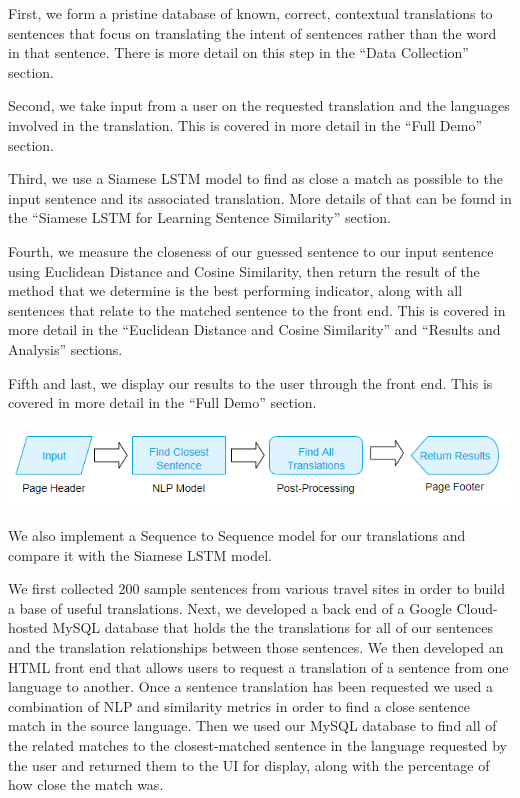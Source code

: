 \documentclass[runningheads]{llncs}
\begin{document}
	First, we form a pristine database of known, correct, contextual translations to sentences that focus on translating the intent of sentences rather than the word in that sentence. There is more detail on this step in the ``Data Collection'' section. 
	
	Second, we take input from a user on the requested translation and the languages involved in the translation. This is covered in more detail in the ``Full Demo'' section. 
	
	Third, we use a Siamese LSTM model to find as close a match as possible to the input sentence and its associated translation.  More details of that can be found in the ``Siamese LSTM for Learning Sentence Similarity'' section. 
	
	Fourth, we measure the closeness of our guessed sentence to our input sentence using Euclidean Distance and Cosine Similarity, then return the result of the method that we determine is the best performing indicator, along with all sentences that relate to the matched sentence to the front end. This is covered in more detail in the ``Euclidean Distance and Cosine Similarity'' and ``Results and Analysis'' sections.
	
	Fifth and last, we display our results to the user through the front end. This is covered in more detail in the ``Full Demo'' section.


	\begin{minipage}{\linewidth}
		\begin{center}
			\hspace*{-.3in}
			\hspace*{-.3in}
			\includegraphics[width=\textwidth]{Process_Map.png}
			\label{fig:Process Map}
			\vspace*{1cm}
		\end{center}
	\end{minipage}
	\afterpage{\clearpage}
	
	We also implement a Sequence to Sequence model for our translations and compare it with the Siamese LSTM model.
	
	We first collected 200 sample sentences from various travel sites in order to build a base of useful translations. Next, we developed a back end of a Google Cloud-hosted MySQL database that holds the the translations for all of our sentences and the translation relationships between those sentences. We then developed an HTML front end that allows users to request a translation of a sentence from one language to another. Once a sentence translation has been requested we used a combination of NLP and similarity metrics in order to find a close sentence match in the source language. Then we used our MySQL database to find all of the related matches to the closest-matched sentence in the language requested by the user and returned them to the UI for display, along with the percentage of how close the match was. 
\end{document}
